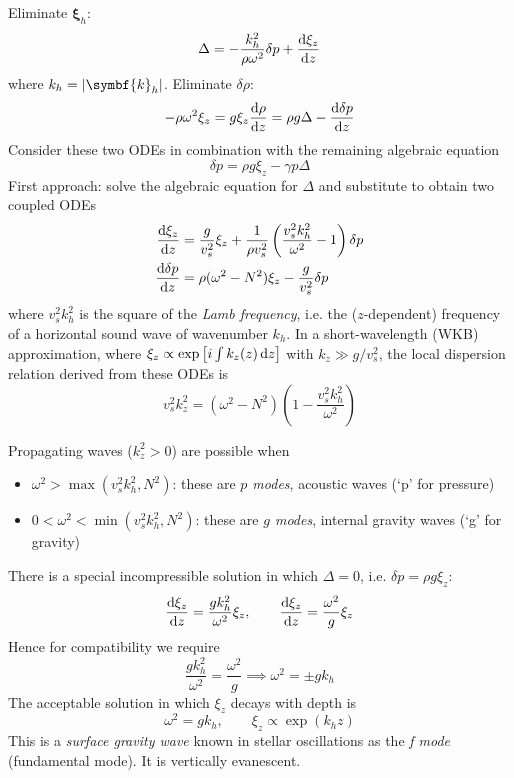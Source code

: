 \documentclass{jknotes}
\newcommand{\disp}{\symbf{\xi}}
\begin{document}
Eliminate $\disp_h$:
\begin{equation}
	\Delta = -\frac{k_h^2}{\rho \omega^2} \delta p + \frac{\diffd
	\xi_z}{\diffd z}
\end{equation}
where $k_h = \abs{\symbf{k}_h}$. Eliminate $\delta \rho$:
\begin{equation}
	-\rho \omega^2 \xi_z = g \xi_z \frac{\diffd \rho}{\diffd z} = \rho g
	\Delta - \frac{\diffd \delta p}{\diffd z}
\end{equation}
Consider these two ODEs in combination with the remaining algebraic equation
\begin{equation}
	\delta p = \rho g \xi_z - \gamma p \Delta
\end{equation}
First approach: solve the algebraic equation for $\Delta$ and substitute to
obtain two coupled ODEs
\begin{align}
	\frac{\diffd \xi_z}{\diffd z} &= \frac{g}{v_s^2} \xi_z + \frac{1}{\rho
	v_s^2} \left( \frac{v_s^2 k_h^2}{\omega^2} - 1\right) \delta p \\
	\frac{\diffd \delta p}{\diffd z} &= \rho (\omega^2 - N^2) \xi_z -
	\frac{g}{v_s^2} \delta p
\end{align}
where $v_s^2 k_h^2$ is the square of the \emph{Lamb frequency}, i.e. the
($z$-dependent) frequency of a horizontal sound wave of wavenumber $k_h$. In a
short-wavelength (WKB) approximation, where $\xi_z \propto \exp\left[i\int
k_z(z)\,\diffd z\right]$ with $k_z \gg g/v_s^2$, the local dispersion relation
derived from these ODEs is
\begin{equation}
	v_s^2 k_z^2 = (\omega^2 - N^2)\left(1-\frac{v_s^2 k_h^2}{\omega^2}\right)
\end{equation}

Propagating waves ($k_z^2 > 0$) are possible when
\begin{itemize}
	\item $\omega^2 > \max(v_s^2 k_h^2, N^2)$: these are \emph{$p$ modes},
		acoustic waves (`p' for pressure)
	\item $0 < \omega^2 < \min(v_s^2 k_h^2, N^2)$: these are \emph{$g$ modes},
		internal gravity waves (`g' for gravity)
\end{itemize}
There is a special incompressible solution in which $\Delta = 0$, i.e. $\delta
p = \rho g \xi_z$:
\begin{equation}
	\frac{\diffd \xi_z}{\diffd z} = \frac{gk_h^2}{\omega^2} \xi_z,
	\hspace{2em} \frac{\diffd \xi_z}{\diffd z} = \frac{\omega^2}{g}\xi_z
\end{equation}
Hence for compatibility we require
\begin{equation}
	\frac{gk_h^2}{\omega^2} = \frac{\omega^2}{g} \implies \omega^2 = \pm gk_h
\end{equation}
The acceptable solution in which $\xi_z$ decays with depth is
\begin{equation}
	\omega^2 = gk_h, \hspace{2em} \xi_z \propto \exp(k_h z)
\end{equation}
This is a \emph{surface gravity wave} known in stellar oscillations as the
\emph{f mode} (fundamental mode). It is vertically evanescent.
\end{document}
